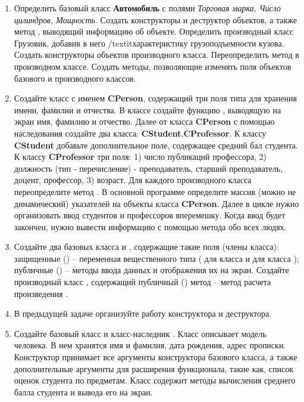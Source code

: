 \begin{enumerate}[leftmargin=*]
    \item Определить базовый класс \textbf{Автомобиль} с полями \textit{Торговая марка, Число цилиндров, Мощность}. Создать конструкторы и деструктор объектов, а также метод , выводящий информацию об объекте. Определить производный класс Грузовик, добавив в него /textit{характеристику грузоподъемности кузова}. Создать конструкторы объектов производного класса. Переопределить метод  в производном классе. Создать методы, позволяющие изменять поля объектов базового и производного классов.
    \item Создайте класс с именем \textbf{CPerson}, содержащий три поля типа  для хранения имени, фамилии и отчества. В классе создайте функцию , выводящую на экран имя, фамилию и отчество. Далее от класса \textbf{CPerson} с помощью наследования создайте два класса: \textbf{CStudent},\textbf{CProfessor}. К классу \textbf{CStudent} добавьте дополнительное поле, содержащее средний бал студента. К классу \textbf{CProfessor} три поля: 1) число публикаций профессора, 2) должность (тип - перечисление) - преподаватель, старший преподаватель, доцент, профессор, 3) возраст. Для каждого производного класса переопределите метод . В основной программе определите массив (можно не динамический) указателей на объекты класса \textbf{CPerson}. Далее в цикле нужно организовать ввод студентов и профессоров вперемешку. Когда ввод будет закончен, нужно вывести информацию с помощью метода  обо всех людях.
    \item Создайте два базовых класса  и , содержащие такие поля (члены класса): защищенные () – переменная вещественного типа ( для класса  и  для класса ); публичные () – методы ввода данных и отображения их на экран. Создайте производный класс ,  содержащий публичный () метод – метод расчета произведения .
    \item В предыдущей задаче организуйте работу конструктора и деструктора.
    \item Создайте базовый класс  и класс-наследник . Класс  описывает модель человека. В нем хранятся имя и фамилия, дата рождения, адрес прописки. Конструктор  принимает все аргументы конструктора базового класса, а также дополнительные аргументы для расширения функционала, такие как, список оценок студента по предметам. Класс  содержит методы вычисления среднего балла студента и вывода его на экран.

\end{enumerate}
